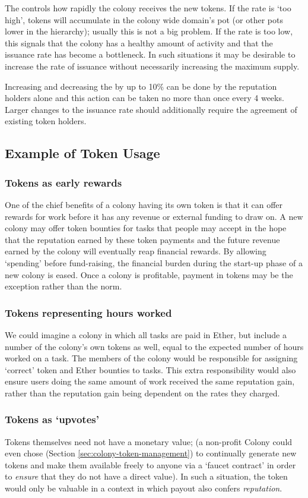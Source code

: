 The  controls how rapidly the colony receives the new tokens. If the rate is `too high', tokens will accumulate in the colony wide domain's pot (or other pots lower in the hierarchy); usually this is not a big problem. If the rate is too low, this signals that the colony has a healthy amount of activity and that the issuance rate has become a bottleneck. In such situations it may be desirable to increase the rate of issuance without necessarily increasing the maximum supply.

Increasing and decreasing the  by up to 10\% can be done by the reputation holders alone and this action can be taken no more than once every 4 weeks. Larger changes to the issuance rate should additionally require the agreement of existing token holders.


\subsection{Example of Token Usage}\label{sec:colony-token-examples}
\subsubsection*{Tokens as early rewards}
One of the chief benefits of a colony having its own token is that it can offer rewards for work before it has any revenue or external funding to draw on.
A new colony may offer token bounties for tasks that people may accept in the hope that the reputation earned by these token payments and the future revenue earned by the colony will eventually reap financial rewards. By allowing `spending' before fund-raising, the financial burden during the start-up phase of a new colony is eased. Once a colony is profitable, payment in tokens may be the exception rather than the norm.

\subsubsection*{Tokens representing hours worked}
We could imagine a colony in which all tasks are paid in Ether, but include a number of the colony's own tokens as well, equal to the expected number of hours worked on a task. The members of the colony would be responsible for assigning `correct' token and Ether bounties to tasks. This extra responsibility would also ensure users doing the same amount of work received the same reputation gain, rather than the reputation gain being dependent on the rates they charged.

\subsubsection*{Tokens as `upvotes'}
Tokens themselves need not have a monetary value; (a non-profit Colony could even chose (Section \ref{sec:colony-token-management}) to continually generate new tokens and make them available freely to anyone via a `faucet contract' in order to \emph{ensure} that they do not have a direct value). In such a situation, the token would only be valuable in a context in which payout also confers \emph{reputation}.